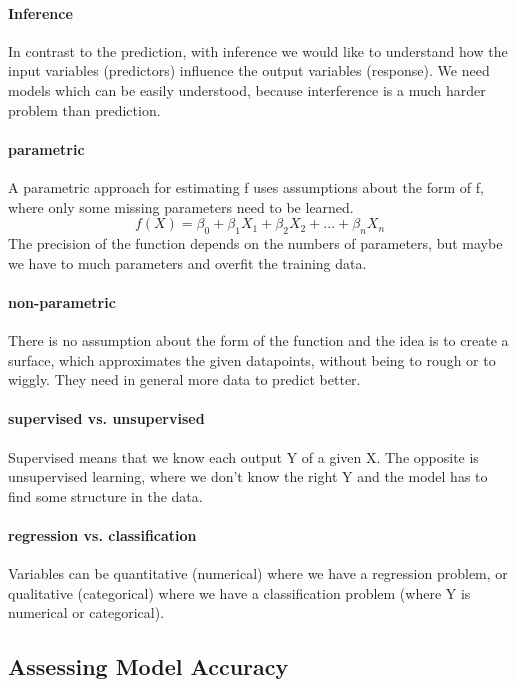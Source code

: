 \documentclass[../document.tex]{subfiles}
\begin{document}
	\paragraph{Inference}
	In contrast to the prediction, with inference we would like to understand how the input variables (predictors) influence the output variables (response). We need models which can be easily understood, because interference is a much harder problem than prediction.

	\paragraph{parametric}
	A parametric approach for estimating f uses assumptions about the form of f, where only some missing parameters need to be learned.
	\begin{equation}
	f(X) = \beta_{0}+\beta_{1}X_{1}+\beta_{2}X_{2}+...+\beta_{n}X_{n}
	\end{equation}
	The precision of the function depends on the numbers of parameters, but maybe we have to much parameters and overfit the training data.

	\paragraph{non-parametric}
	There is no assumption about the form of the function and the idea is to create a surface, which approximates the given datapoints, without being to rough or to wiggly. They need in general more data to predict better.

	\paragraph{supervised vs. unsupervised}
	Supervised means that we know each output Y of a given X. The opposite is unsupervised learning, where we don't know the right Y and the model has to find some structure in the data.

	\paragraph{regression vs. classification}
	Variables can be quantitative (numerical) where we have a regression problem, or qualitative (categorical) where we have a classification problem (where Y is numerical or categorical).


	\subsection{Assessing Model Accuracy}
\end{document}
